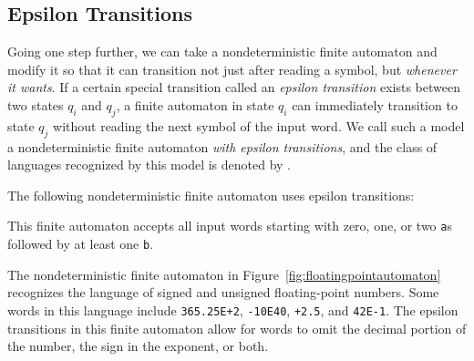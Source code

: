 \subsection{Epsilon Transitions}

Going one step further, we can take a nondeterministic finite automaton and modify it so that it can transition not just after reading a symbol, but \emph{whenever it wants}. If a certain special transition called an \emph{epsilon transition} exists between two states $q_{i}$ and $q_{j}$, a finite automaton in state $q_{i}$ can immediately transition to state $q_{j}$ without reading the next symbol of the input word. We call such a model a nondeterministic finite automaton \emph{with epsilon transitions}, and the class of languages recognized by this model is denoted by \ENFA.

\begin{example}
The following nondeterministic finite automaton uses epsilon transitions:
\begin{center}
\end{center}
This finite automaton accepts all input words starting with zero, one, or two \texttt{a}s followed by at least one \texttt{b}.
\end{example}

\begin{example}
The nondeterministic finite automaton in Figure~\ref{fig:floatingpointautomaton} recognizes the language of signed and unsigned floating-point numbers. Some words in this language include \texttt{365.25E+2}, \texttt{-10E40}, \texttt{+2.5}, and \texttt{42E-1}. The epsilon transitions in this finite automaton allow for words to omit the decimal portion of the number, the sign in the exponent, or both.
\end{example}

